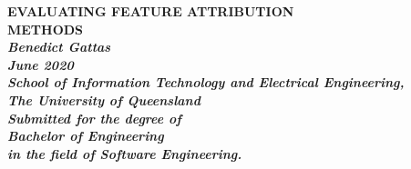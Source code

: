 \documentclass[main]{subfiles}
\begin{document}
\begin{titlepage}
\renewcommand{\baselinestretch}{1.0}
\begin{center}
\vspace*{35mm}
\Large\bf
		EVALUATING FEATURE ATTRIBUTION\\
		METHODS\\
\vspace{30mm}
\large\sl
		Benedict Gattas
		\medskip\\
\normalsize
		June 2020		
		\medskip\\
\vspace{40mm}
\normalsize
		School of Information Technology and Electrical Engineering,\\
		The University of Queensland\\
\vspace{40mm}
		Submitted for the degree of\\
		Bachelor of Engineering
		\smallskip\\
\normalsize
		in the field of Software Engineering.
		\medskip\\

\end{center}
\end{titlepage}
\end{document}
